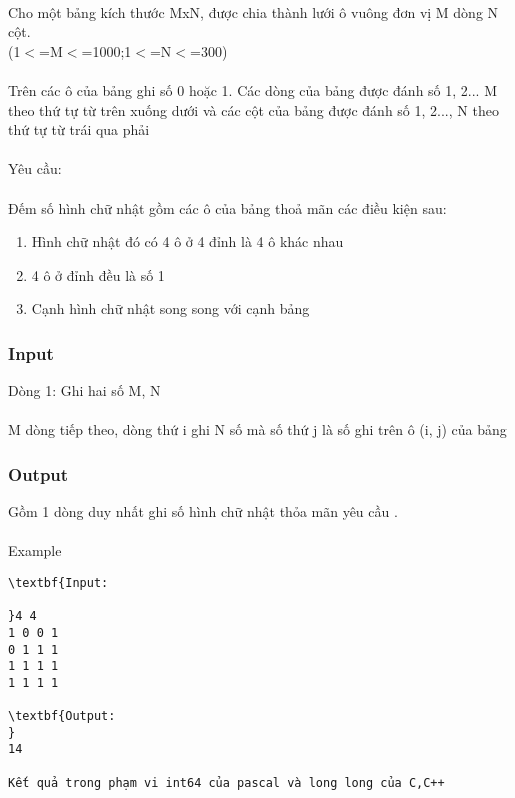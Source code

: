 

 

Cho một bảng kích thước MxN, được chia thành lưới ô vuông đơn vị M dòng N cột.
\\(1$<$=M$<$=1000;1$<$=N$<$=300)
\\
\\Trên các ô của bảng ghi số 0 hoặc 1. Các dòng của bảng được đánh số 1, 2... M theo thứ tự từ trên xuống dưới và các cột của bảng được đánh số 1, 2..., N theo thứ tự từ trái qua phải
\\
\\Yêu cầu:
\\
\\Đếm số hình chữ nhật gồm các ô của bảng thoả mãn các điều kiện sau:
\begin{enumerate}
	\item Hình chữ nhật đó có 4 ô ở 4 đỉnh là 4 ô khác nhau
	\item 4 ô ở đỉnh đều là số 1
	\item Cạnh hình chữ nhật song song với cạnh bảng
\end{enumerate}

\subsubsection{Input}

Dòng 1: Ghi hai số M, N
\\
\\M dòng tiếp theo, dòng thứ i ghi N số mà số thứ j là số ghi trên ô (i, j) của bảng

\subsubsection{Output}

Gồm 1 dòng duy nhất ghi số hình chữ nhật thỏa mãn yêu cầu .
\\
\\Example
\begin{verbatim}
\textbf{Input:

}4 4
1 0 0 1
0 1 1 1
1 1 1 1
1 1 1 1

\textbf{Output:
}
14

Kết quả trong phạm vi int64 của pascal và long long của C,C++


\end{verbatim}